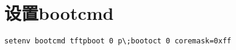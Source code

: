 \section{设置bootcmd}
\begin{verbatim}
setenv bootcmd tftpboot 0 p\;bootoct 0 coremask=0xff
\end{verbatim}
